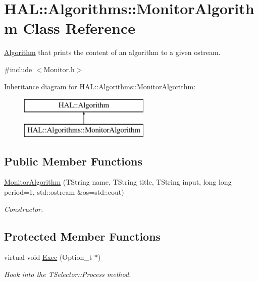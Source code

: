 \hypertarget{class_h_a_l_1_1_algorithms_1_1_monitor_algorithm}{\section{H\+A\+L\+:\+:Algorithms\+:\+:Monitor\+Algorithm Class Reference}
\label{class_h_a_l_1_1_algorithms_1_1_monitor_algorithm}
}


\hyperlink{class_h_a_l_1_1_algorithm}{Algorithm} that prints the content of an algorithm to a given ostream.  




{\ttfamily \#include $<$Monitor.\+h$>$}

Inheritance diagram for H\+A\+L\+:\+:Algorithms\+:\+:Monitor\+Algorithm\+:\begin{figure}[H]
\begin{center}
\leavevmode
\includegraphics[height=2.000000cm]{class_h_a_l_1_1_algorithms_1_1_monitor_algorithm}
\end{center}
\end{figure}
\subsection*{Public Member Functions}
\begin{DoxyCompactItemize}
\item 
\hyperlink{class_h_a_l_1_1_algorithms_1_1_monitor_algorithm_ac37ea6c50b23dbb49b63d9fe551554a7}{Monitor\+Algorithm} (T\+String name, T\+String title, T\+String input, long long period=1, std\+::ostream \&os=std\+::cout)
\begin{DoxyCompactList}\small\item\em Constructor. \end{DoxyCompactList}\end{DoxyCompactItemize}
\subsection*{Protected Member Functions}
\begin{DoxyCompactItemize}
\item 
virtual void \hyperlink{class_h_a_l_1_1_algorithms_1_1_monitor_algorithm_ae1efc679e7dcbc8692a6b37dca0517c3}{Exec} (Option\+\_\+t $\ast$)
\begin{DoxyCompactList}\small\item\em Hook into the T\+Selector\+::\+Process method. \end{DoxyCompactList}\end{DoxyCompactItemize}
